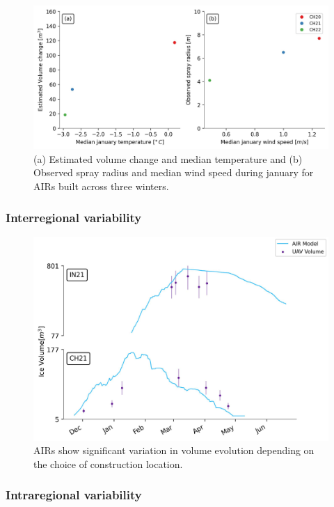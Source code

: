 \begin{figure}[t]
\centering
\includegraphics[width=\textwidth]{figs/CH_diffs.jpg}
\caption{(a) Estimated volume change and median temperature and (b) Observed spray radius and median wind speed
during january for AIRs built across three winters. } 
\label{fig:CH_diffs}
\end{figure}

\subsubsection{Interregional variability}

\begin{figure}[t]
\centering
\includegraphics[width=12cm]{figs/IN21vsCH21.jpg}
\caption{AIRs show significant variation in volume evolution depending on the choice of construction location.}
\label{fig:2AIRs}
\end{figure}

\subsubsection{Intraregional variability}

